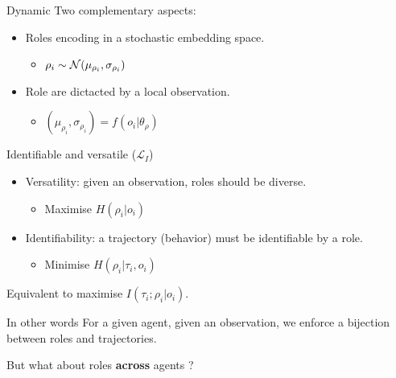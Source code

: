 \documentclass{beamer}
\begin{document}
    \begin{frame}{Dynamic}
        Two complementary aspects:

        \begin{itemize}
            \item Roles encoding in a stochastic embedding space.
            \begin{itemize}
                \item $\rho_i \sim \mathcal{N}(\mu_{\rho_i},\sigma_{\rho_i})$
            \end{itemize}
            \item Role are dictacted by a local observation.
            \begin{itemize}
                \item $(\mu_{\rho_i},\sigma_{\rho_i}) = f(o_i|\theta_{\rho})$
            \end{itemize}
        \end{itemize}

    \end{frame}

    \begin{frame}{Identifiable and versatile ($\mathcal{L}_{I}$)}

        \begin{itemize}
            \item Versatility: given an observation, roles should be diverse.
            \begin{itemize}
                \item Maximise $H(\rho_i|o_i)$
            \end{itemize}
            \item Identifiability: a trajectory (behavior) must be identifiable by a role.
            \begin{itemize}
                \item Minimise $H(\rho_i|\tau_i, o_i)$
            \end{itemize}
        \end{itemize}

        \begin{block}{}
            Equivalent to maximise $I(\tau_i;\rho_i|o_i)$.
        \end{block}
        \begin{block}{In other words}
            For a given agent, given an observation, we enforce a bijection between roles and trajectories.
        \end{block}
        \begin{alertblock}{}
            But what about roles \textbf{across} agents ?
        \end{alertblock}

    \end{frame}
\end{document}

